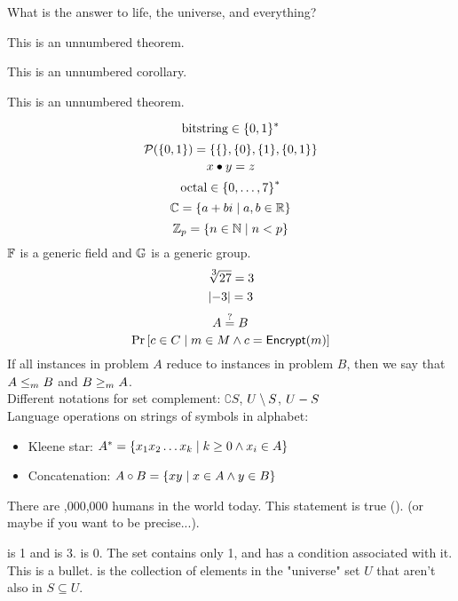 \documentclass{article}
\begin{document}
\begin{problem}
    What is the answer to life, the universe, and everything?
\end{problem}
\begin{solution}
    \begin{theorem*}
        This is an unnumbered theorem.
    \end{theorem*}
    \begin{corollary*}
        This is an unnumbered corollary.
    \end{corollary*}
    \begin{lemma*}
        This is an unnumbered theorem.
    \end{lemma*}
    $$\str{bitstring} \in \bitset$$
    $$\powerset{\set{0,1}} = \set{\set{}, \set{0}, \set{1}, \set{0,1}}$$
    $$x \bullet y = z$$
    $$\str{octal} \in \lset{0}{7}^*$$
    $$\C = \cset{a + bi}{a,b \in \R}$$
    $$\Zmod{p} = \cset{n \in \N}{n < p}$$
    $\F$ is a generic field and $\G$ is a generic group.\\
    $$\nthroot{3}{27} = 3$$
    $$\abs{-3} = 3$$
    $$ A \stackrel{?}{=} B$$
    $$\Pr{c \in C \given m \in M \land c = \algoname{Encrypt}(m) }$$
    If all instances in problem $A$ reduce to instances in problem $B$, then we say that $A \leq_m B$ and $B \geq_m A$.\\
    Different notations for set complement: $\complement{S}$, $\setcomplement{U}{S}$, $\minuscomplement{U}{S}$\\
    Language operations on strings of symbols in alphabet:
    \begin{itemize}
        \item Kleene star: $\kleenestar{A} = \cset{x_1 x_2 \ldots x_k}{k \geq 0 \land x_i \in A}$
        \item Concatenation: $\concat{A}{B} = \cset{xy}{x \in A \land y \in B}$
    \end{itemize}
    \par There are ,000,000 humans in the world today. This statement is true (\true). (or maybe \false if you want to be precise...). 
    \par {} is 1 and  is 3.  is 0. The set  contains only 1, and  has a condition associated with it. This \bigcdot is a bullet.  is the collection of elements in the "universe" set $U$ that aren't also in $S \subseteq U$.

\end{solution}
\end{document}
